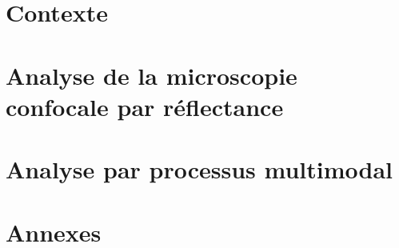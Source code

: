 \documentclass[english,standardlists]{spimubphdthesis}
\begin{document}
\mainmatter
\renewcommand\chaptermark[1]{\markboth{\uppercase{#1}}{}}
\renewcommand\glossarymark[1]{\markboth{\uppercase{#1}}{}}



\part{Contexte}
\label{part:contexte}





\part{Analyse de la microscopie confocale par réflectance}
\label{part:microscopy}





\part{Analyse par processus multimodal}
\label{part:multimodal}






\part{Annexes}
\label{part:annexes}	



			
\backmatter

\renewcommand{\bibname}{Bibliographie}




\renewcommand*\listfigurename{Liste des figures}
\listoffigures

\listoftables



\printglossary[type=\acronymtype,style=listaltacr,title={Liste des acronymes}]%

\appendix
\end{document}
